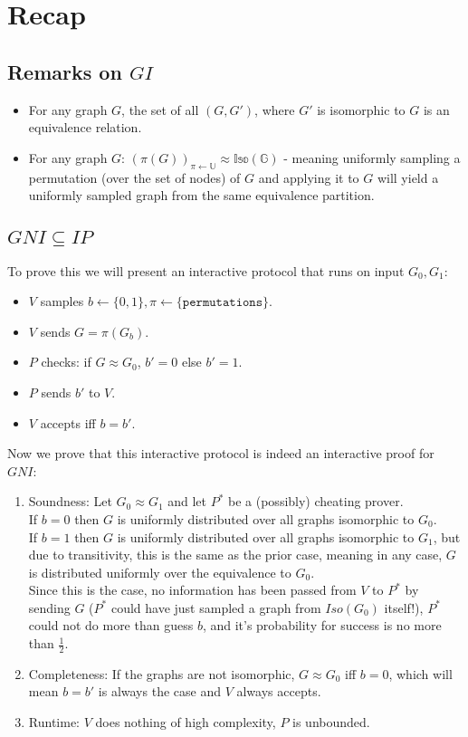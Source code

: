\section*{Recap}
\subsection*{Remarks on $GI$}
\begin{itemize}
    \item For any graph $G$, the set of all $(G,G')$, where $G'$ is isomorphic to $G$ is an equivalence relation.
    \item For any graph $G$: $(\pi(G))_{\pi\leftarrow\mathbb{U}}\approx\mathbb{Iso(G)}$ - meaning uniformly sampling a permutation (over the set of nodes) of $G$ and applying it to $G$ will yield a uniformly sampled graph from the same equivalence partition.
\end{itemize}
\subsection*{$GNI\subseteq IP$}
To prove this we will present an interactive protocol that runs on input $G_0, G_1$:
\begin{itemize}
    \item $V$ samples $b\leftarrow \{0,1\},\pi\leftarrow \{\texttt{permutations}\}$.
    \item $V$ sends $G=\pi(G_b)$.
    \item $P$ checks: if $G\approx G_0$, $b'=0$ else $b'=1$.
    \item $P$ sends $b'$ to $V$.
    \item $V$ accepts iff $b=b'$.
\end{itemize}
Now we prove that this interactive protocol is indeed an interactive proof for $GNI$:
\begin{enumerate}
    \item Soundness:
    Let $G_0\approx G_1$ and let $P^*$ be a (possibly) cheating prover.\\
    If $b=0$ then $G$ is uniformly distributed over all graphs isomorphic to $G_0$.\\ If $b=1$ then $G$ is uniformly distributed over all graphs isomorphic to $G_1$, but due to transitivity, this is the same as the prior case, meaning in any case, $G$ is distributed uniformly over the equivalence to $G_0$.\\
    Since this is the case, no information has been passed from $V$ to $P^*$ by sending $G$ ($P^*$ could have just sampled a graph from $Iso(G_0)$ itself!), $P^*$ could not do more than guess $b$, and it's probability for success is no more than $\frac{1}{2}$.
    \item Completeness: If the graphs are not isomorphic, $G\approx G_0$ iff $b=0$, which will mean $b=b'$ is always the case and $V$ always accepts.
    \item Runtime: $V$ does nothing of high complexity, $P$ is unbounded.
\end{enumerate}


